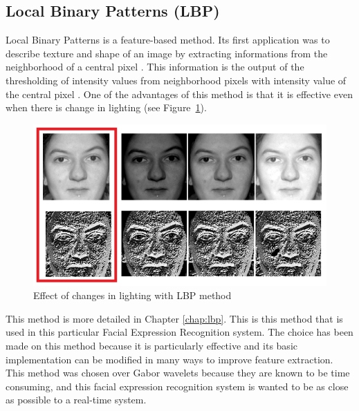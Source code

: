\subsection{Local Binary Patterns (LBP)}

\vspace{\baselineskip}
\noindent Local Binary Patterns is a feature-based method. Its first application was to describe texture and shape of an image by extracting informations from the neighborhood of a central pixel \cite{OJA96}. This information is the output of the thresholding of intensity values from neighborhood pixels with intensity value of the central pixel \cite{GAN08}. One of the advantages of this method is that it is effective even when there is change in lighting (see Figure~\ref{lbp_change_lighting}).
\newline

\begin{figure}[!h]
\begin{center}
\noindent \includegraphics[scale=0.6]{figures/lbp_change_lighting} 
\newline
\caption{Effect of changes in lighting with LBP method}
\label{lbp_change_lighting}
\end{center} 
\end{figure}

\noindent This method is more detailed in Chapter \ref{chap:lbp}. This is this method that is used in this particular Facial Expression Recognition system. The choice has been made on this method because it is particularly effective and its basic implementation can be modified in many ways to improve feature extraction. This method was chosen over Gabor wavelets because they are known to be time consuming, and this facial expression recognition system is wanted to be as close as possible to a real-time system.
\newline

